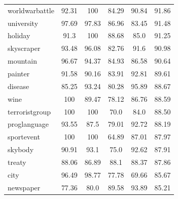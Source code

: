 \begin{table}[h]
\begin{center}
\begin{tabular}{l|c|c|c|c||c}
      worldwarbattle    &             92.31  &                100  &                  84.29  &                   90.84  &    91.86  \\
      university        &             97.69  &              97.83  &                  86.96  &                   83.45  &    91.48  \\
      holiday           &              91.3  &                100  &                  88.68  &                    85.0  &    91.25  \\
      skyscraper        &             93.48  &              96.08  &                  82.76  &                    91.6  &    90.98  \\
      mountain          &             96.67  &              94.37  &                  84.93  &                   86.58  &    90.64  \\
      painter           &             91.58  &              90.16  &                  83.91  &                   92.81  &    89.61  \\
      disease           &             85.25  &              93.24  &                  80.28  &                   95.89  &    88.67  \\
      wine              &               100  &              89.47  &                  78.12  &                   86.76  &    88.59  \\
      terroristgroup    &               100  &                100  &                   70.0  &                    84.0  &    88.50  \\
      proglanguage      &             93.55  &               87.5  &                  79.01  &                   92.72  &    88.19  \\
      sportevent        &               100  &                100  &                  64.89  &                   87.01  &    87.97  \\
      skybody           &             90.91  &               93.1  &                   75.0  &                   92.62  &    87.91  \\
      treaty            &             88.06  &              86.89  &                   88.1  &                   88.37  &    87.86  \\
      city              &             96.49  &              98.77  &                  77.78  &                   69.66  &    85.67  \\
      newspaper         &             77.36  &               80.0  &                  89.58  &                   93.89  &    85.21  \\

\end{tabular}
\end{center}
\end{table}
